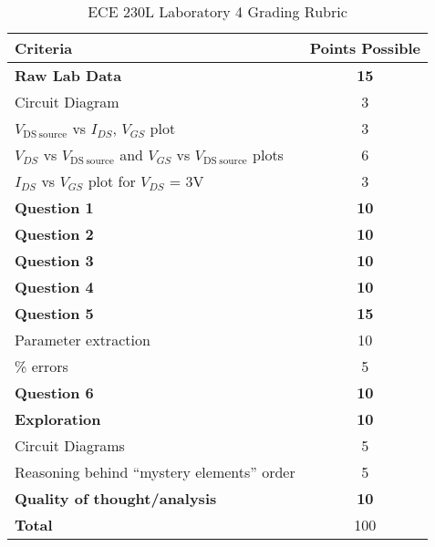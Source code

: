 \documentclass[12pt]{../manual}
\begin{document}
%
\newpage
{}
{}
\hspace{0pt}
\vfill %
\begin{table}[ht!]
\caption{ECE 230L Laboratory 4 Grading Rubric}
\centering
\begin{tabular}{l|c} \hline
Criteria & Points Possible \\ \hline \hline
\textbf{Raw Lab Data} 							& \textbf{15} \\
Circuit Diagram 								& 3 \\
$V_{\mathrm{DS~source}}$ vs $I_{DS}$, $V_{GS}$ plot & 3 \\
$V_{DS}$ vs $V_{\mathrm{DS~source}}$ and $V_{GS}$ vs $V_{\mathrm{DS~source}}$ plots 	& 6 \\
$I_{DS}$ vs $V_{GS}$ plot for $V_{DS}$ = 3V 		& 3 \\ \hline
\textbf{Question 1} 							& \textbf{10} \\ \hline
\textbf{Question 2} 							& \textbf{10} \\ \hline
\textbf{Question 3} 							& \textbf{10} \\ \hline
\textbf{Question 4} 							& \textbf{10} \\ \hline
\textbf{Question 5} 							& \textbf{15} \\
Parameter extraction							& 10 \\ 
\% errors										& 5 \\ \hline
\textbf{Question 6} 							& \textbf{10} \\ \hline
\textbf{Exploration} 							& \textbf{10} \\
Circuit Diagrams								& 5 \\
Reasoning behind ``mystery elements'' order		& 5 \\ \hline
\textbf{Quality of thought/analysis} 			& \textbf{10} \\ \hline \hline
\textbf{Total} 									& 100 \\ \hline
\end{tabular}
\end{table}
\vfill %
\end{document}
